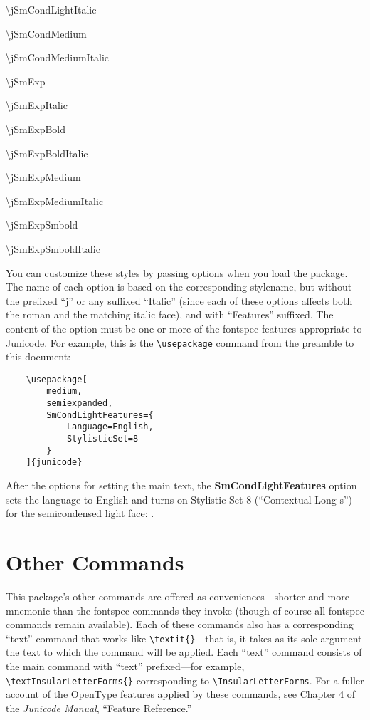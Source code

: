 \documentclass{article}
\newcommand{\fspec}{{\sffamily fontspec}}
\begin{document}
\begin{multicols}{3}
    \textbackslash jSmCondLightItalic
    
    \textbackslash jSmCondMedium
    
    \textbackslash jSmCondMediumItalic
    
    \textbackslash jSmExp
    
    \textbackslash jSmExpItalic
    
    \textbackslash jSmExpBold
    
    \textbackslash jSmExpBoldItalic
    
    \textbackslash jSmExpMedium
    
    \textbackslash jSmExpMediumItalic
    
    \textbackslash jSmExpSmbold
    
    \textbackslash jSmExpSmboldItalic
\end{multicols}

\noindent You can customize these styles by passing options when you load the package.
The name of each option is based on the corresponding stylename, but without the
prefixed “j” or any suffixed “Italic” (since each of these options
affects both the roman and the matching italic face), and with “Features” suffixed.
The content of the option must be one or more of the {\fspec} features appropriate to
Junicode. For example, this is the {\verb|\usepackage|} command from the preamble to
this document:

\begin{verbatim}
    \usepackage[
        medium,
        semiexpanded,
        SmCondLightFeatures={
            Language=English,
            StylisticSet=8
        }
    ]{junicode}
\end{verbatim}

\noindent After the options for setting the main text, the \textbf{SmCondLightFeatures}
option sets the language to English and turns on Stylistic Set 8 (“Contextual Long s”)
for the semicondensed light face:
{\jSmCondLight {}}.

\section{Other Commands}

This package's other commands are offered as conveniences---shorter and more
mnemonic than the {\fspec} commands they invoke (though of course all {\fspec} commands
remain available). Each of these commands
also has a corresponding “text” command that works like 
{\verb|\textit{}|}—that is, it takes
as its sole argument the text to which the command will be applied. Each “text” command
consists of the main command with “text” prefixed—for example,
{\verb|\textInsularLetterForms{}|}
corresponding to {\verb|\InsularLetterForms|}.  For a fuller account of the OpenType features
applied by these commands, see Chapter 4 of the \textit{Junicode Manual}, “Feature Reference.”
\end{document}
